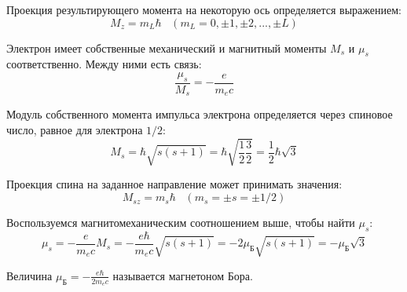 \documentclass{article}
\begin{document}
	Проекция результирующего момента на некоторую ось определяется выражением:
	\begin{equation}
		M_z = m_L\hbar\;\;\;(m_L=0,\pm 1,\pm 2,...,\pm L)
	\end{equation}

	Электрон имеет собственные механический и магнитный моменты $M_s$ и $\mu_s$ соответственно. Между ними есть связь:
	\begin{equation}
		\frac{\mu_s}{M_s} = -\frac{e}{m_e c}
	\end{equation}

	Модуль собственного момента импульса электрона определяется через спиновое число, равное для электрона $1/2$:
	\begin{equation}
		M_s = \hbar\sqrt{s(s+1)} = \hbar\sqrt{\frac{1}{2}\frac{3}{2}}=\frac{1}{2}\hbar\sqrt{3}
	\end{equation}

	Проекция спина на заданное направление может принимать значения:
	\begin{equation}
		M_{sz}=m_s\hbar\;\;\;(m_s=\pm s = \pm 1/2)
	\end{equation}

	Воспользуемся магнитомеханическим соотношением выше, чтобы найти $\mu_s$:
	\begin{equation}
		\mu_s = -\frac{e}{m_e c}M_s = -\frac{e\hbar}{m_e c}\sqrt{s(s+1)} = -2\mu_\text{Б}\sqrt{s(s+1)}=-\mu_\text{Б}\sqrt{3}
	\end{equation}

	Величина $\mu_\text{Б}=-\frac{e\hbar}{2m_ec}$ называется магнетоном Бора.
	
\end{document}
